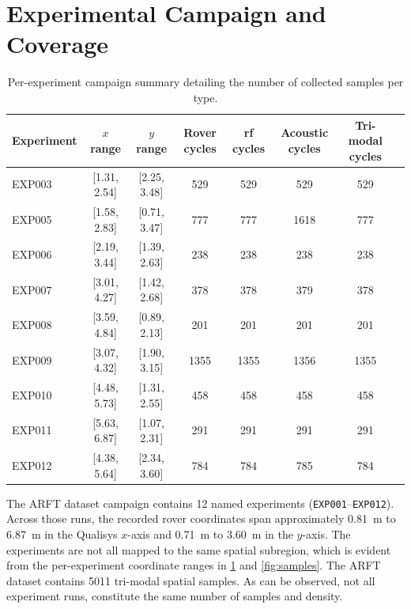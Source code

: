 \section{Experimental Campaign and Coverage}
\label{sec:campaign}

\begin{table}[t]
    \centering
    \caption{Per-experiment campaign summary detailing the number of collected samples per type. 
    }
    \label{tab:experiments}
    \scriptsize
    \setlength{\tabcolsep}{5pt}
    \begin{tabular}{lccccccc}
        \toprule
        Experiment & $x$ range & $y$ range & Rover cycles & \gls{rf} cycles & Acoustic cycles & Tri-modal cycles \\
        \midrule
        EXP003 & [1.31, 2.54] & [2.25, 3.48] & 529  & 529  & 529  & 529 \\
        EXP005 & [1.58, 2.83] & [0.71, 3.47] & 777 & 777  & 1618 & 777 \\
        EXP006 & [2.19, 3.44] & [1.39, 2.63] & 238  & 238  & 238  & 238 \\
        EXP007 & [3.01, 4.27] & [1.42, 2.68] & 378  & 378  & 379  & 378 \\
        EXP008 & [3.59, 4.84] & [0.89, 2.13] & 201  & 201  & 201  & 201 \\
        EXP009 & [3.07, 4.32] & [1.90, 3.15] & 1355 & 1355 & 1356 & 1355 \\
        EXP010 & [4.48, 5.73] & [1.31, 2.55] & 458  & 458  & 458  & 458 \\
        EXP011 & [5.63, 6.87] & [1.07, 2.31] & 291  & 291  & 291  & 291 \\
        EXP012 & [4.38, 5.64] & [2.34, 3.60] & 784  & 784  & 785  & 784 \\
        \bottomrule
    \end{tabular}
\end{table}

The ARFT dataset campaign contains 12 named experiments (\texttt{EXP001}--\texttt{EXP012}). Across those runs, the recorded rover coordinates span approximately 0.81~m to 6.87~m in the Qualisys $x$-axis and 0.71~m to 3.60~m in the $y$-axis. The experiments are not all mapped to the same spatial subregion, which is evident from the per-experiment coordinate ranges in \cref{tab:experiments} and \cref{fig:samples}. The ARFT dataset contains 5011 tri-modal spatial samples. As can be observed, not all experiment runs, constitute the same number of samples and density.

